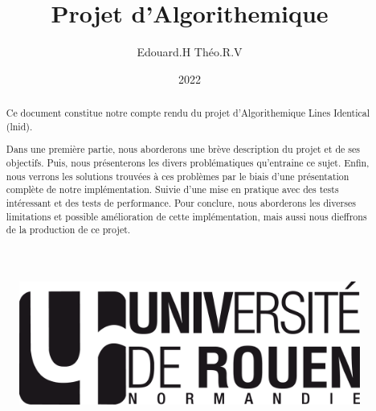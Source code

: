 \documentclass[12pt]{article}
\title{Projet d'Algorithemique}
\author{Edouard.H Théo.R.V}
\date{2022\-2023}
\begin{document}
    \begin{figure}
        \includegraphics[scale=0.3, right]{logo-univ-rouen-normandie-noir.png}
    \end{figure}
    
    \maketitle

    \begin{abstract}
        Ce document constitue notre compte rendu du projet d'Algorithemique 
        Lines Identical (lnid).

        Dans une première partie, nous aborderons une brève description du 
        projet et de ses objectifs.     
        Puis, nous présenterons les divers problématiques qu'entraine ce sujet.
        Enfin, nous verrons les solutions trouvées à ces problèmes par le biais 
        d'une présentation complète de notre implémentation. Suivie d'une mise 
        en pratique avec des tests intéressant et des tests de performance. Pour
         conclure, nous aborderons les diverses limitations et possible 
         amélioration de cette implémentation, mais aussi nous dieffrons de la 
         production de ce projet.
    \end{abstract}

    \tableofcontents
    
    \newpage
\end{document}
